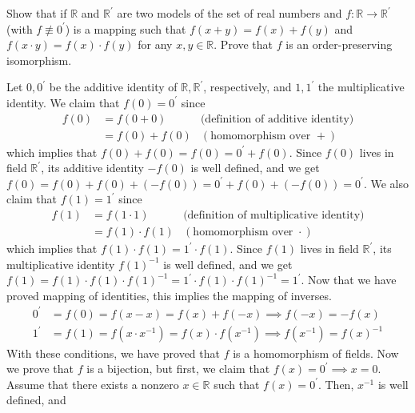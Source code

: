   \begin{exercise}[Zorich 2.2.23]
    Show that if $\mathbb{R}$ and $\mathbb{R}^\prime$ are two models of the set of real numbers and $f: \mathbb{R} \longrightarrow \mathbb{R}^\prime$ (with $f \not\equiv 0^\prime$) is a mapping such that $f(x + y) = f(x) + f(y)$ and $f(x \cdot y) = f(x) \cdot f(y)$ for any $x, y \in \mathbb{R}$. Prove that $f$ is an order-preserving isomorphism. 
  \end{exercise}
  \begin{solution}
    Let $0, 0^\prime$ be the additive identity of $\mathbb{R}, \mathbb{R}^\prime$, respectively, and $1, 1^\prime$ the multiplicative identity. We claim that $f(0) = 0^\prime$ since
    \begin{align*}
      f(0) & = f(0 + 0) & \text{(definition of additive identity)} \\
      & = f(0) + f(0) & (\text{homomorphism over } + )
    \end{align*}
    which implies that $f(0) + f(0) = f(0) = 0^\prime + f(0) $. Since $f(0)$ lives in field $\mathbb{R}^\prime$, its additive identity $-f(0)$ is well defined, and we get $f(0) = f(0) + f(0) + (-f(0)) = 0^\prime + f(0) + (-f(0)) = 0^\prime$. We also claim that $f(1) = 1^\prime$ since 
    \begin{align*}
      f(1) & = f(1 \cdot 1) & \text{(definition of multiplicative identity)} \\
      & = f(1) \cdot f(1) & (\text{homomorphism over } \cdot ) 
    \end{align*}
    which implies that $f(1) \cdot f(1) = 1^\prime \cdot f(1)$. Since $f(1)$ lives in field $\mathbb{R}^\prime$, its multiplicative identity $f(1)^{-1}$ is well defined, and we get $f(1) = f(1) \cdot f(1) \cdot f(1)^{-1} = 1^\prime \cdot f(1) \cdot f(1)^{-1} = 1^\prime$. Now that we have proved mapping of identities, this implies the mapping of inverses. 
    \begin{align*}
      0^\prime & = f(0) = f(x - x) = f(x) + f(-x) \implies f(-x) = -f(x) \\
      1^\prime & = f(1) = f(x \cdot x^{-1}) = f(x) \cdot f(x^{-1}) \implies f(x^{-1}) = f(x)^{-1}
    \end{align*}
    With these conditions, we have proved that $f$ is a homomorphism of fields. Now we prove that $f$ is a bijection, but first, we claim that $f(x) = 0^\prime \implies x = 0$. Assume that there exists a nonzero $x \in \mathbb{R}$ such that $f(x) = 0^\prime$. Then, $x^{-1}$ is well defined, and 
    \begin{align*}

\end{align*}
\end{solution}
